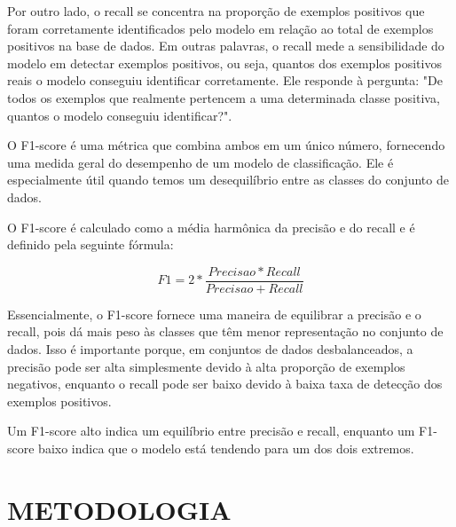 Por outro lado, o recall se concentra na proporção de exemplos positivos que foram corretamente identificados pelo modelo em relação ao total de exemplos positivos na base de dados. Em outras palavras, o recall mede a sensibilidade do modelo em detectar exemplos positivos, ou seja, quantos dos exemplos positivos reais o modelo conseguiu identificar corretamente. Ele responde à pergunta: "De todos os exemplos que realmente pertencem a uma determinada classe positiva, quantos o modelo conseguiu identificar?".

O F1-score é uma métrica que combina ambos em um único número, fornecendo uma medida geral do desempenho de um modelo de classificação. Ele é especialmente útil quando temos um desequilíbrio entre as classes do conjunto de dados.

O F1-score é calculado como a média harmônica da precisão e do recall e é definido pela seguinte fórmula:

\[
    F1 = 2*\frac{Precisao * Recall}{Precisao+Recall}
\]

Essencialmente, o F1-score fornece uma maneira de equilibrar a precisão e o recall, pois dá mais peso às classes que têm menor representação no conjunto de dados. Isso é importante porque, em conjuntos de dados desbalanceados, a precisão pode ser alta simplesmente devido à alta proporção de exemplos negativos, enquanto o recall pode ser baixo devido à baixa taxa de detecção dos exemplos positivos.

Um F1-score alto indica um equilíbrio entre precisão e recall, enquanto um F1-score baixo indica que o modelo está tendendo para um dos dois extremos.

\chapter{METODOLOGIA}
\label{cap:metodologia}

